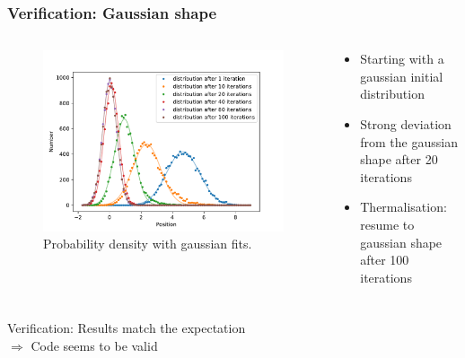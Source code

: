 \documentclass[aspectratio=169]{beamer}
\begin{document}
\begin{frame}
	\frametitle{Verification: Gaussian shape}
	\vspace{-15px}
	\begin{columns}
		\begin{column}{0.6\textwidth}
			\begin{figure}[H]
				\centering
					\includegraphics[width=\textwidth]{../imgs/harmonic_oscillator_track/track_10010000_gauss_1_fit.pdf}
				\caption{Probability density with gaussian fits.}
				\label{fig:harmonic_oscillator_track_10010000_gauss_1_fit}
			\end{figure}
		\end{column}
		\begin{column}{0.39\textwidth}
			\begin{itemize}
				\item Starting with a gaussian initial distribution
				\item Strong deviation from the gaussian shape after 20 iterations
				\item Thermalisation: resume to gaussian shape after 100 iterations
			\end{itemize}
		\end{column}
	\end{columns}
\end{frame}


\begin{frame}
\frametitle{}
\begin{center}
	Verification: Results match the expectation
	\\
	$\Rightarrow$ Code seems to be valid
\end{center}
\end{frame}
\end{document}
